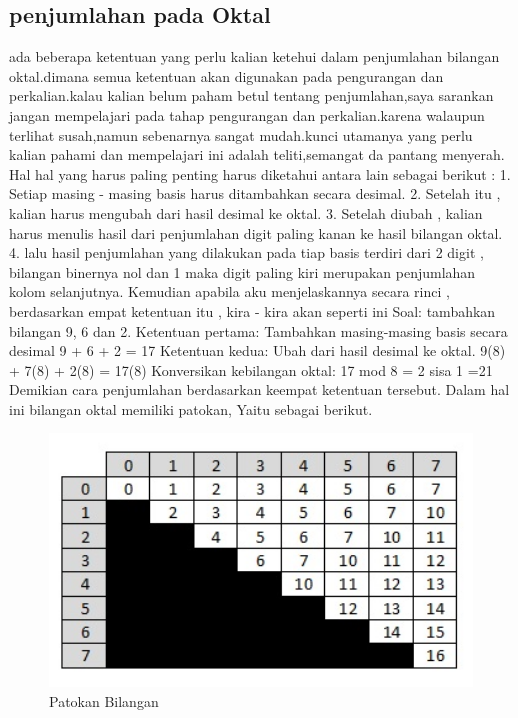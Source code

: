  	\subsection{penjumlahan pada Oktal}
 ada beberapa ketentuan yang perlu kalian ketehui dalam penjumlahan bilangan oktal.dimana semua ketentuan akan digunakan pada pengurangan dan perkalian.kalau kalian belum paham betul tentang penjumlahan,saya sarankan jangan mempelajari pada tahap pengurangan dan perkalian.karena walaupun terlihat susah,namun sebenarnya sangat mudah.kunci utamanya yang perlu kalian pahami dan mempelajari ini adalah teliti,semangat da pantang menyerah.
 Hal hal yang harus paling penting harus diketahui antara lain sebagai berikut  :
1. Setiap masing - masing basis harus ditambahkan secara desimal.
2. Setelah itu , kalian harus  mengubah dari hasil desimal ke oktal.
3. Setelah diubah  , kalian harus menulis hasil dari penjumlahan digit paling kanan ke hasil bilangan oktal.
4. lalu hasil penjumlahan yang dilakukan pada tiap basis terdiri dari 2 digit , bilangan binernya nol dan 1 maka digit paling kiri merupakan  penjumlahan kolom selanjutnya.
Kemudian apabila aku menjelaskannya secara rinci , berdasarkan empat ketentuan itu , kira - kira akan seperti ini 
Soal: tambahkan bilangan 9, 6 dan 2.
Ketentuan pertama:
Tambahkan masing-masing basis secara desimal
9 + 6 + 2 = 17
Ketentuan kedua:
Ubah dari hasil desimal ke oktal.
9(8) + 7(8) + 2(8) = 17(8)
Konversikan kebilangan oktal:
17 mod 8 = 2 sisa 1
=21
Demikian cara penjumlahan berdasarkan keempat ketentuan tersebut.
Dalam hal ini bilangan oktal memiliki patokan, Yaitu sebagai berikut.

	
	\begin{figure}[ht]
	\centerline{\includegraphics[width=1\textwidth]{figures/tabelpertambahanbilanganoktal.JPG}}
	\caption{Patokan Bilangan}
	\label{tabelpertambahanbilanganoktal}
	\end{figure}

